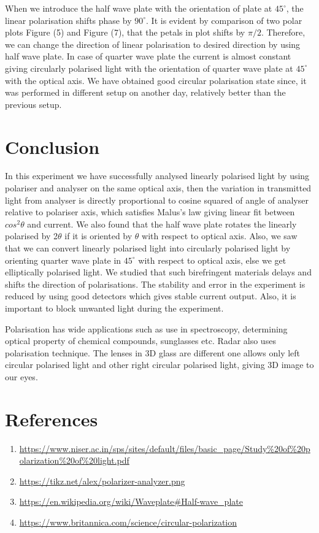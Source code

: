 \documentclass[a4paper, amsfonts, amssymb, amsmath, reprint, showkeys, nofootinbib, twoside]{revtex4-1}
\begin{document}
When we introduce the half wave plate with the orientation of plate at $45^{\circ}$, the linear polarisation shifts phase by $90^{\circ}$. It is evident by comparison of two polar plots Figure (5) and Figure (7), that the petals in plot shifts by $\pi/2$. Therefore, we can change the direction of linear polarisation to desired direction by using half wave plate. In case of quarter wave plate the current is almost constant giving circularly polarised light with the orientation of quarter wave plate at $45^{\circ}$ with the optical axis. We have obtained good circular polarisation state since, it was performed in different setup on another day, relatively better than the previous setup. 

\section{Conclusion}
In this experiment we have successfully analysed linearly polarised light by using polariser and analyser on the same optical axis, then the variation in transmitted light from analyser is directly proportional to cosine squared of angle of analyser relative to polariser axis, which satisfies Malus's law giving linear fit between $cos^2{\theta}$ and current. We also found that the half wave plate rotates the linearly polarised by 2$\theta$ if it is oriented by $\theta$ with respect to optical axis. Also, we saw that we can convert linearly polarised light into circularly polarised light by orienting quarter wave plate in $45^{\circ}$ with respect to optical axis, else we get elliptically polarised light. We studied that such birefringent materials delays and shifts the direction of polarisations. The stability and error in the experiment is reduced by using good detectors which gives stable current output. Also, it is important to block unwanted light during the experiment.

Polarisation  has wide applications such as use in spectroscopy, determining optical property of chemical compounds, sunglasses etc. Radar also uses polarisation technique.
The lenses in 3D glass are different one allows only left circular polarised light and other right circular polarised light, giving 3D image to our eyes. 
 
\section{References}
\begin{enumerate}
\item{\url{https://www.niser.ac.in/sps/sites/default/files/basic_page/Study%20of%20polarization%20of%20light.pdf}}
\item {\url{https://tikz.net/alex/polarizer-analyzer.png}}
\item {\url{https://en.wikipedia.org/wiki/Waveplate#Half-wave_plate}}
\item {\url{https://www.britannica.com/science/circular-polarization}}
\end{enumerate}
\end{document}
